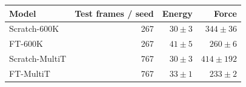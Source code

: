 \begin{tabular}{lrrr}
\toprule
Model & Test frames / seed & Energy & Force \\
\midrule
Scratch-600K & 267 & $30\pm3$ & $344\pm36$ \\
FT-600K & 267 & $41\pm5$ & $260\pm6$ \\
Scratch-MultiT & 767 & $30\pm3$ & $414\pm192$ \\
FT-MultiT & 767 & $33\pm1$ & $233\pm2$ \\
\bottomrule
\end{tabular}
